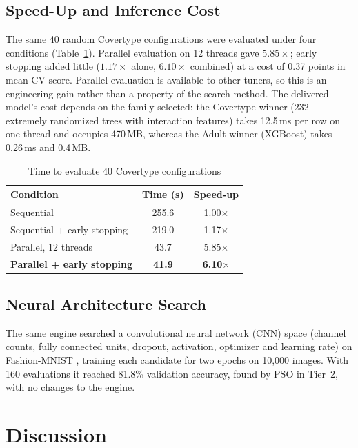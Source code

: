 \documentclass[conference]{IEEEtran}
\begin{document}
\subsection{Speed-Up and Inference Cost}
The same 40 random Covertype configurations were evaluated under four conditions (Table~\ref{tab:speedup}). Parallel evaluation on 12 threads gave $5.85\times$; early stopping added little ($1.17\times$ alone, $6.10\times$ combined) at a cost of 0.37 points in mean CV score. Parallel evaluation is available to other tuners, so this is an engineering gain rather than a property of the search method. The delivered model's cost depends on the family selected: the Covertype winner (232 extremely randomized trees with interaction features) takes 12.5\,ms per row on one thread and occupies 470\,MB, whereas the Adult winner (XGBoost) takes 0.26\,ms and 0.4\,MB.

\begin{table}[t]
\caption{Time to evaluate 40 Covertype configurations}
\label{tab:speedup}
\centering
\begin{tabular}{lcc}
\toprule
\textbf{Condition} & \textbf{Time (s)} & \textbf{Speed-up} \\
\midrule
Sequential & 255.6 & 1.00$\times$ \\
Sequential + early stopping & 219.0 & 1.17$\times$ \\
Parallel, 12 threads & 43.7 & 5.85$\times$ \\
\textbf{Parallel + early stopping} & \textbf{41.9} & \textbf{6.10$\times$} \\
\bottomrule
\end{tabular}
\end{table}

\subsection{Neural Architecture Search}
The same engine searched a convolutional neural network (CNN) space (channel counts, fully connected units, dropout, activation, optimizer and learning rate) on Fashion-MNIST \cite{xiao2017fashion}, training each candidate for two epochs on 10,000 images. With 160 evaluations it reached 81.8\% validation accuracy, found by PSO in Tier~2, with no changes to the engine.

\section{Discussion}\label{sec:discussion}
\end{document}
